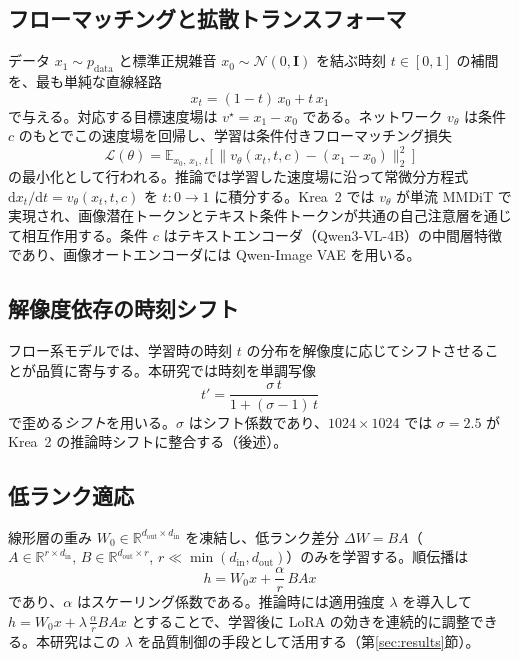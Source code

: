 \documentclass[10pt,twocolumn]{ltjsarticle}
\begin{document}
\subsection{フローマッチングと拡散トランスフォーマ}
データ $x_1\sim p_{\text{data}}$ と標準正規雑音 $x_0\sim\mathcal{N}(0,\mathbf I)$ を結ぶ時刻 $t\in[0,1]$ の補間を、最も単純な直線経路
\begin{equation}
x_t=(1-t)\,x_0 + t\,x_1
\label{eq:interp}
\end{equation}
で与える。対応する目標速度場は $v^\star=x_1-x_0$ である。ネットワーク $v_\theta$ は条件 $c$ のもとでこの速度場を回帰し、学習は条件付きフローマッチング損失
\begin{equation}
\mathcal{L}(\theta)=\mathbb{E}_{x_0,\,x_1,\,t}\Big[\,\big\lVert v_\theta(x_t,t,c)-(x_1-x_0)\big\rVert_2^2\,\Big]
\label{eq:fmloss}
\end{equation}
の最小化として行われる。推論では学習した速度場に沿って常微分方程式 $\mathrm{d}x_t/\mathrm{d}t=v_\theta(x_t,t,c)$ を $t:0\to1$ に積分する。Krea~2 では $v_\theta$ が単流 MMDiT で実現され、画像潜在トークンとテキスト条件トークンが共通の自己注意層を通じて相互作用する。条件 $c$ はテキストエンコーダ（Qwen3-VL-4B）の中間層特徴であり、画像オートエンコーダには Qwen-Image VAE を用いる。

\subsection{解像度依存の時刻シフト}
フロー系モデルでは、学習時の時刻 $t$ の分布を解像度に応じてシフトさせることが品質に寄与する。本研究では時刻を単調写像
\begin{equation}
t' = \frac{\sigma\, t}{1+(\sigma-1)\,t}
\label{eq:shift}
\end{equation}
で歪める\emph{シフト}を用いる。$\sigma$ はシフト係数であり、$1024\times1024$ では $\sigma=2.5$ が Krea~2 の推論時シフトに整合する（後述）。

\subsection{低ランク適応}
線形層の重み $W_0\in\mathbb{R}^{d_\text{out}\times d_\text{in}}$ を凍結し、低ランク差分 $\Delta W=BA$（$A\in\mathbb{R}^{r\times d_\text{in}},\,B\in\mathbb{R}^{d_\text{out}\times r}$, $r\ll\min(d_\text{in},d_\text{out})$）のみを学習する。順伝播は
\begin{equation}
h = W_0 x + \frac{\alpha}{r}\,B A x
\label{eq:lora}
\end{equation}
であり、$\alpha$ はスケーリング係数である。推論時には適用強度 $\lambda$ を導入して $h=W_0x+\lambda\,\frac{\alpha}{r}BAx$ とすることで、学習後に LoRA の効きを連続的に調整できる。本研究はこの $\lambda$ を品質制御の手段として活用する（第\ref{sec:results}節）。
\end{document}
